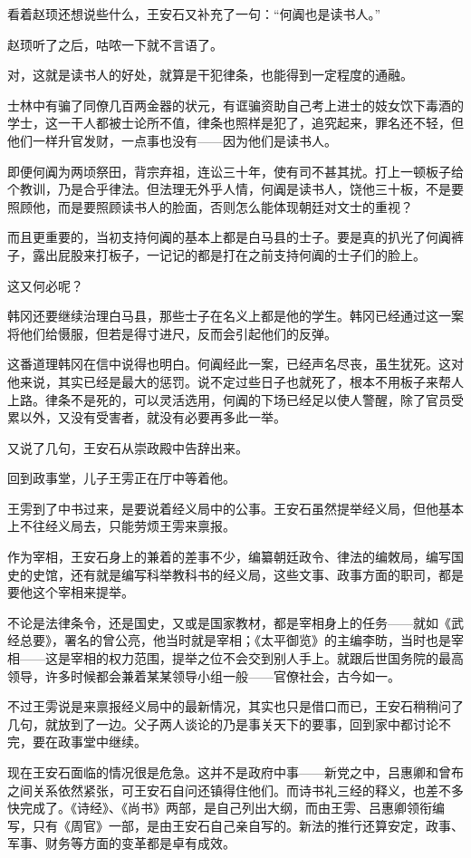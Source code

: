 看着赵顼还想说些什么，王安石又补充了一句：“何阗也是读书人。”

赵顼听了之后，咕哝一下就不言语了。

对，这就是读书人的好处，就算是干犯律条，也能得到一定程度的通融。

士林中有骗了同僚几百两金器的状元，有诓骗资助自己考上进士的妓女饮下毒酒的学士，这一干人都被士论所不值，律条也照样是犯了，追究起来，罪名还不轻，但他们一样升官发财，一点事也没有——因为他们是读书人。

即便何阗为两顷祭田，背宗弃祖，连讼三十年，使有司不甚其扰。打上一顿板子给个教训，乃是合乎律法。但法理无外乎人情，何阗是读书人，饶他三十板，不是要照顾他，而是要照顾读书人的脸面，否则怎么能体现朝廷对文士的重视？

而且更重要的，当初支持何阗的基本上都是白马县的士子。要是真的扒光了何阗裤子，露出屁股来打板子，一记记的都是打在之前支持何阗的士子们的脸上。

这又何必呢？

韩冈还要继续治理白马县，那些士子在名义上都是他的学生。韩冈已经通过这一案将他们给慑服，但若是得寸进尺，反而会引起他们的反弹。

这番道理韩冈在信中说得也明白。何阗经此一案，已经声名尽丧，虽生犹死。这对他来说，其实已经是最大的惩罚。说不定过些日子也就死了，根本不用板子来帮人上路。律条不是死的，可以灵活选用，何阗的下场已经足以使人警醒，除了官员受累以外，又没有受害者，就没有必要再多此一举。

又说了几句，王安石从崇政殿中告辞出来。

回到政事堂，儿子王雱正在厅中等着他。

王雱到了中书过来，是要说着经义局中的公事。王安石虽然提举经义局，但他基本上不往经义局去，只能劳烦王雱来禀报。

作为宰相，王安石身上的兼着的差事不少，编纂朝廷政令、律法的编敇局，编写国史的史馆，还有就是编写科举教科书的经义局，这些文事、政事方面的职司，都是要他这个宰相来提举。

不论是法律条令，还是国史，又或是国家教材，都是宰相身上的任务——就如《武经总要》，署名的曾公亮，他当时就是宰相；《太平御览》的主编李昉，当时也是宰相——这是宰相的权力范围，提举之位不会交到别人手上。就跟后世国务院的最高领导，许多时候都会兼着某某领导小组一般——官僚社会，古今如一。

不过王雱说是来禀报经义局中的最新情况，其实也只是借口而已，王安石稍稍问了几句，就放到了一边。父子两人谈论的乃是事关天下的要事，回到家中都讨论不完，要在政事堂中继续。

现在王安石面临的情况很是危急。这并不是政府中事——新党之中，吕惠卿和曾布之间关系依然紧张，可王安石自问还镇得住他们。而诗书礼三经的释义，也差不多快完成了。《诗经》、《尚书》两部，是自己列出大纲，而由王雱、吕惠卿领衔编写，只有《周官》一部，是由王安石自己亲自写的。新法的推行还算安定，政事、军事、财务等方面的变革都是卓有成效。


